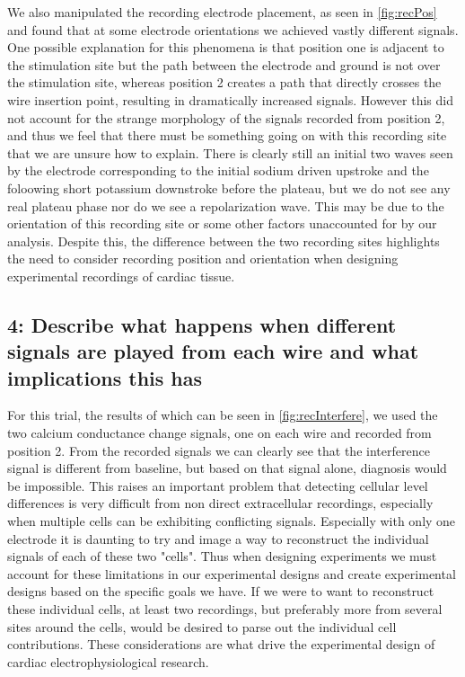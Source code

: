\documentclass[12pt]{article}
\begin{document}
\par{}
We also manipulated the recording electrode placement, as seen in \ref{fig:recPos} and found that at some electrode orientations we achieved vastly different signals. One possible explanation for this phenomena is that position one is adjacent to the stimulation site but the path between the electrode and ground is not over the stimulation site, whereas position 2 creates a path that directly crosses the wire insertion point, resulting in dramatically increased signals. However this did not account for the strange morphology of the signals recorded from position 2, and thus we feel that there must be something going on with this recording site that we are unsure how to explain. There is clearly still an initial two waves seen by the electrode corresponding to the initial sodium driven upstroke and the foloowing short potassium downstroke before the plateau, but we do not see any real plateau phase nor do we see a repolarization wave. This may be due to the orientation of this recording site or some other factors unaccounted for by our analysis.
 Despite this, the difference between the two recording sites highlights the need to consider recording position and orientation when designing experimental recordings of cardiac tissue.

\subsection{4: Describe what happens when different signals are played from each wire and what implications this has}
\par{}
For this trial, the results of which can be seen in \ref{fig:recInterfere}, we used the two calcium conductance change signals, one on each wire and recorded from position 2. From the recorded signals we can clearly see that the interference signal is different from baseline, but based on that signal alone, diagnosis would be impossible. This raises an important problem that detecting cellular level differences is very difficult from non direct extracellular recordings, especially when multiple cells can be exhibiting conflicting signals. Especially with only one electrode it is daunting to try and image a way to reconstruct the individual signals of each of these two "cells". Thus when designing experiments we must account for these limitations in our experimental designs and create experimental designs based on the specific goals we have. If we were to want to reconstruct these individual cells, at least two recordings, but preferably more from several sites around the cells, would be desired to parse out the individual cell contributions. These considerations are what drive the experimental design of cardiac electrophysiological research.
\end{document}
